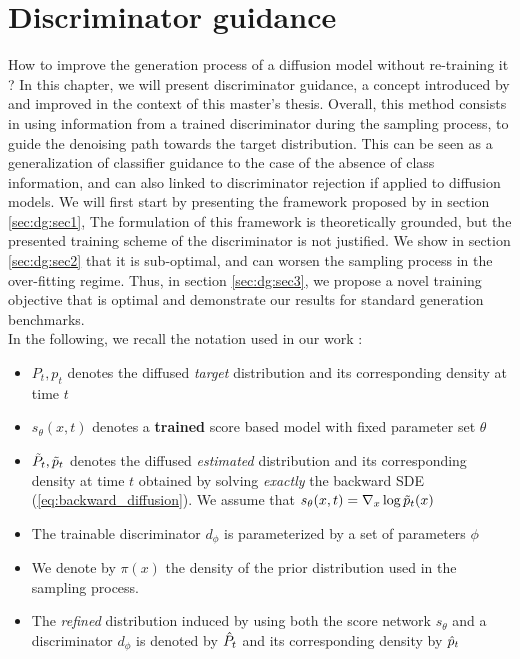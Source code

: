 %
\chapter{Discriminator guidance}\label{sec:dg}

How to improve the generation process of a diffusion model without re-training it ? In this chapter, we will present discriminator guidance, a concept introduced by \citep{kim2023refininggenerativeprocessdiscriminator} and improved in the context of this master's thesis. Overall, this method consists in using information from a trained discriminator during the sampling process, to guide the denoising path towards the target distribution. This can be seen as a generalization of classifier guidance \citep{dhariwal2021diffusionmodelsbeatgans} to the case of the absence of class information, and can also linked to discriminator rejection \citep{azadi2019discriminatorrejectionsampling} if applied to diffusion models.
We will first start by presenting the framework proposed by \citep{kim2023refininggenerativeprocessdiscriminator} in section \ref{sec:dg:sec1}, The formulation of this framework is theoretically grounded, but the presented training scheme of the discriminator is not justified. We show in section \ref{sec:dg:sec2} that it is sub-optimal, and can worsen the sampling process in the over-fitting regime. Thus, in section \ref{sec:dg:sec3}, we propose a novel training objective that is optimal and demonstrate our results for standard generation benchmarks.
\\
In the following, we recall the notation used in our work :
\begin{itemize}
    \item $P_{t},p_{t}$ denotes the diffused \textit{target} distribution and its corresponding density at time $t$
    \item $s_{\theta}(x,t)$ denotes a \textbf{trained} score based model with fixed parameter set $\theta$
    \item $\Tilde{P}_{t},\Tilde{p}_{t}$ denotes the diffused \textit{estimated} distribution and its corresponding density at time $t$ obtained by solving \textit{exactly} the backward SDE (\ref{eq:backward_diffusion}). We assume that $s_{\theta}(x,t) = \nabla_{x}\log\Tilde{p}_{t}(x)$
    \item The trainable discriminator $d_{\phi}$ is parameterized by a set of parameters $\phi$
    \item We denote by $\pi(x)$ the density of the prior distribution used in the sampling process.
    \item The \textit{refined} distribution induced by using both the score network $s_{\theta}$ and a discriminator $d_{\phi}$ is denoted by $\Hat{P}_{t}$ and its corresponding density by $\Hat{p}_{t}$
\end{itemize}


